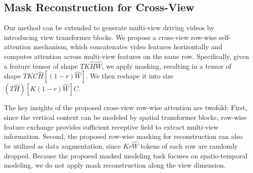 \subsection{Mask Reconstruction for Cross-View}
\label{sec:3.4}
Our method can be extended to generate multi-view driving videos by introducing view transformer blocks. We propose a cross-view row-wise self-attention mechanism, which concatenates video features horizontally and computes attention across multi-view features on the same row. Specifically, given a feature tensor of shape $ TK\hat{H}\hat{W} $, we apply masking, resulting in a tensor of shape $ TKC\hat{H} [(1 - r)\hat{W}] $. We then reshape it into size $ (T\hat{H})[K(1 - r)\hat{W}]C $. 

The key insights of the proposed cross-view row-wise attention are twofold: First, since the vertical context can be modeled by spatial transformer blocks, row-wise feature exchange provides sufficient receptive field to extract multi-view information. Second, the proposed row-wise masking for reconstruction can also be utilized as data augmentation, since $Kr\hat{W}$ tokens of each row are randomly dropped. Because the proposed masked modeling task focuses on spatio-temporal modeling, we do not apply mask reconstruction along the view dimension.

